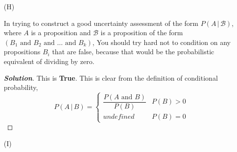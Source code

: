 \documentclass[12pt]{article}
\newcommand{\given}{\, | \,}
\newenvironment{solution}{\begin{proof}[\textbf{\textit{Solution}}] }{\end{proof}}
\begin{document}
\begin{itemize}
Specifying the ingredients $\{ p ( \theta \given { \mathcal B } ), p ( D \given
\theta \, { \mathcal B } ), ( { \mathcal A \given { \mathcal B } } ), U ( a, \theta \given { \mathcal B } ) \}$ in Your model for Your uncertainty about an unknown $\theta$ (in light of background information $\mathcal B$ and data $D$) is typically easy, because in any given problem there will typically be one and only one way to specify each of these ingredients; an example is the Bernoulli sampling distribution $p ( D \given \theta \, { \mathcal B } )$ arising uniquely, under exchangeability, from de Finetti's Theorem for binary outcomes.
\begin{tcolorbox}[breakable]
    \begin{solution}
        This is \textbf{False} up to the semicolon. A counter example would be our prior information uncertainty in CS1: $P(\theta = 1 \given \mathcal{B}_{Bob})$ this value changed depending on what risk factors for Bob for HIV we judge to be relevant in defining the similarity judgement that specify $\mathbb{P}_{Bob}$. So this would be true if we replace the word "easy" with "hard" since there will actually be a number of possible ways we can specify these ingredients. 
    \end{solution}
\end{tcolorbox}


\item[(H)]

In trying to construct a good uncertainty assessment of the form $P ( A \given
\mathcal B )$, where $A$ is a proposition and $\mathcal B$ is a proposition
of the form $( B_1 \textrm{ and } B_2 \textrm{ and } \dots \textrm{ and }
B_k )$, You should try hard not to condition on any propositions $B_i$ that
are false, because that would be the probabilistic equivalent of dividing
by zero.  
\begin{tcolorbox}[breakable]
    \begin{solution}
        This is \textbf{True}. This is clear from the definition of conditional probability,
        \[P(A \given  B) = \begin{cases}\dfrac{P(A \text{ and } B)}{P(B)}  & P(B) > 0 \\ undefined & P(B) = 0 \end{cases}\]
        \end{solution}
\end{tcolorbox}


\item[(I)]


\end{itemize}
\end{document}
